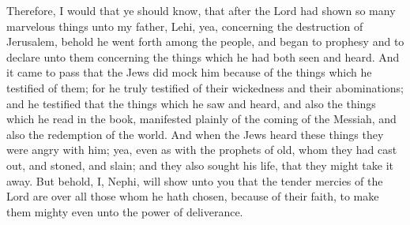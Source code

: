 Therefore, I would that ye should know, that after the Lord had shown so many marvelous things unto my father, Lehi, yea, concerning the destruction of Jerusalem, behold he went forth among the people, and began to prophesy and to declare unto them concerning the things which he had both seen and heard.
\bverse \iffalse And it came to pass that the Jews did mock him because of the things which he testified of them; for he truly testified of their wickedness and their abominations; and he testified that the things which he saw and heard, and also the things which he read in the book, manifested plainly of the coming of the Messiah, and also the redemption of the world. \fi
And it came to pass that the Jews did mock him because of the things which he testified of them; for he truly testified of their wickedness and their abominations; and he testified that the things which he saw and heard, and also the things which he read in the book, manifested plainly of the coming of the Messiah, and also the redemption of the world.
\bverse \iffalse And when the Jews heard these things they were angry with him; yea, even as with the prophets of old, whom they had cast out, and stoned, and slain; and they also sought his life, that they might take it away. But behold, I, Nephi, will show unto you that the tender mercies of the Lord are over all those whom he hath chosen, because of their faith, to make them mighty even unto the power of deliverance. \fi
And when the Jews heard these things they were angry with him; yea, even as with the prophets of old, whom they had cast out, and stoned, and slain; and they also sought his life, that they might take it away. But behold, I, Nephi, will show unto you that the tender mercies of the Lord are over all those whom he hath chosen, because of their faith, to make them mighty even unto the power of deliverance.

